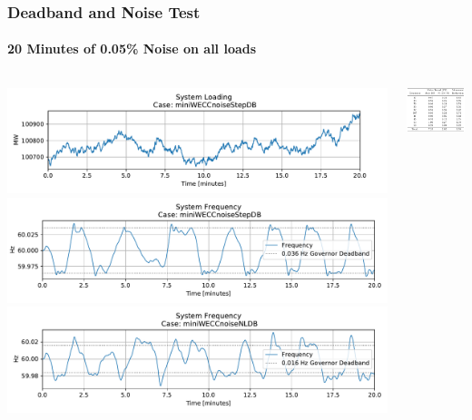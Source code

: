 \documentclass[14pt, unknownkeysallowed]{beamer}
\begin{document}
\begin{frame}
\frametitle{Deadband and Noise Test}
\framesubtitle{20 Minutes of 0.05\% Noise on all loads}
\begin{columns}
\begin{column}{.5\linewidth}
\includegraphics[width=\linewidth]{miniWECCnoiseStepDBPload}
\includegraphics[width=\linewidth]{miniWECCnoiseStepDBFreq}
\includegraphics[width=\linewidth]{miniWECCnoiseNLDBFreq}
\end{column}
\begin{column}{.5\linewidth}
\includegraphics[width=\linewidth]{miniWECCnoiseRes01}
\end{column}
\end{columns}
\end{frame}
\end{document}
